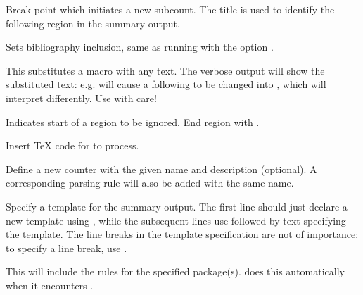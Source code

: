 
\begin{description}

Break point which initiates a new subcount. The title is used to identify the following region in the summary output.

Sets bibliography inclusion, same as running \TeXcount{} with the option .

This substitutes a macro with any text. The verbose output will show the substituted text: e.g.  will cause a following  to be changed into , which \TeXcount{} will interpret differently. Use with care!

\option[ignore]
Indicates start of a region to be ignored. End region with .

Insert \TeX{} code for \TeXcount{} to process.

Define a new counter with the given name and description (optional). A corresponding parsing rule will also be added with the same name.

Specify a template for the summary output. The first line should just declare a new template using , while the subsequent lines use  followed by text specifying the template. The line breaks in the template specification are not of importance: to specify a line break, use .

This will include the \TeXcount{} rules for the specified package(s). \TeXcount{} does this automatically when it encounters
.

\end{description}
